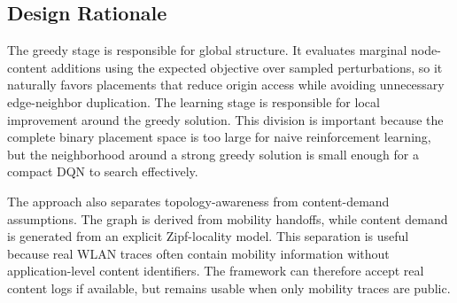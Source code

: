 \subsection{Design Rationale}

The greedy stage is responsible for global structure. It evaluates marginal node-content additions using the expected objective over sampled perturbations, so it naturally favors placements that reduce origin access while avoiding unnecessary edge-neighbor duplication. The learning stage is responsible for local improvement around the greedy solution. This division is important because the complete binary placement space is too large for naive reinforcement learning, but the neighborhood around a strong greedy solution is small enough for a compact DQN to search effectively.

The approach also separates topology-awareness from content-demand assumptions. The graph is derived from mobility handoffs, while content demand is generated from an explicit Zipf-locality model. This separation is useful because real WLAN traces often contain mobility information without application-level content identifiers. The framework can therefore accept real content logs if available, but remains usable when only mobility traces are public.






